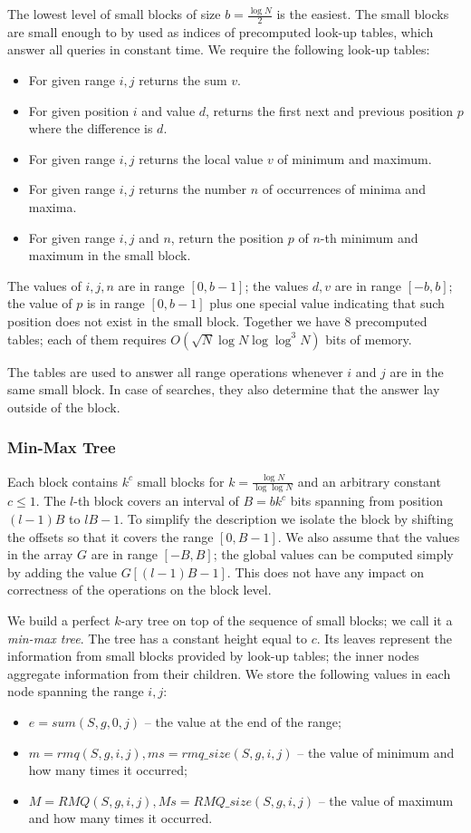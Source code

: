 The lowest level of small blocks of size $b = \frac{\log N}{2}$ is the easiest.
The small blocks are small enough to by used as indices of precomputed look-up tables, which answer all queries in constant time.
We require the following look-up tables:
\begin{itemize}
	\item For given range $i, j$ returns the sum $v$.
	\item For given position $i$ and value $d$, returns the first next and previous position $p$ where the difference is $d$.
	\item For given range $i, j$ returns the local value $v$ of minimum and maximum.
	\item For given range $i, j$ returns the number $n$ of occurrences of minima and maxima.
	\item For given range $i, j$ and $n$, return the position $p$ of $n$-th minimum and maximum in the small block.
\end{itemize}
The values of $i, j, n$ are in range $[0, b - 1]$; the values $d, v$ are in range $[-b, b]$; the value of $p$ is in range $[0, b - 1]$ plus one special value indicating that such position does not exist in the small block.
Together we have 8 precomputed tables; each of them requires $O(\sqrt{N} \log N \log \log^3 N)$ bits of memory.

The tables are used to answer all range operations whenever $i$ and $j$ are in the same small block.
In case of searches, they also determine that the answer lay outside of the block.

\subsubsection{Min-Max Tree}

Each block contains $k^c$ small blocks for $k = \frac{\log N}{\log \log N}$ and an arbitrary constant $c \le 1$.
The $l$-th block covers an interval of $B = b k^c$ bits spanning from position $(l-1) B$ to $l B - 1$.
To simplify the description we isolate the block by shifting the offsets so that it covers the range $[0, B - 1]$.
We also assume that the values in the array $G$ are in range $[-B, B]$; the global values can be computed simply by adding the value $G[(l-1) B - 1]$.
This does not have any impact on correctness of the operations on the block level.

We build a perfect $k$-ary tree on top of the sequence of small blocks; we call it a \emph{min-max tree}.
The tree has a constant height equal to $c$.
Its leaves represent the information from small blocks provided by look-up tables; the inner nodes aggregate information from their children.
We store the following values in each node spanning the range $i, j$:
\begin{itemize}
	\item $e = sum(S, g, 0, j)$ -- the value at the end of the range;
	\item $m = rmq(S, g, i, j), ms = rmq\_size(S, g, i, j)$ -- the value of minimum and how many times it occurred;
	\item $M = RMQ(S, g, i, j), Ms = RMQ\_size(S, g, i, j)$ -- the value of maximum and how many times it occurred.
\end{itemize}

